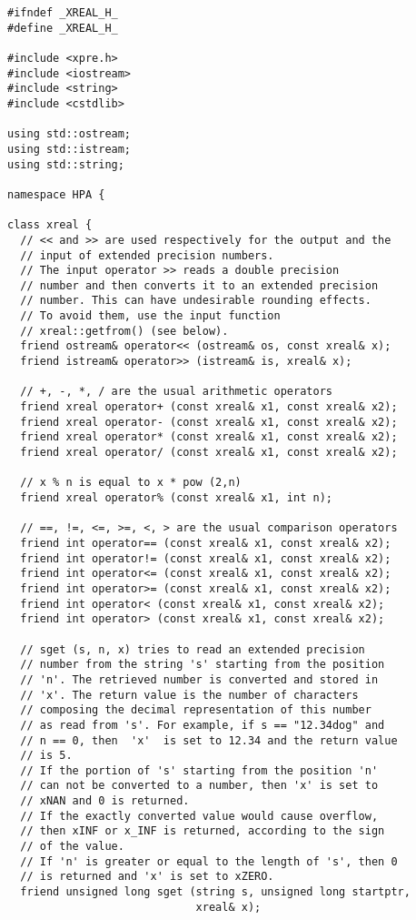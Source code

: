 \documentclass{article}
\begin{document}
\begin{verbatim}
#ifndef _XREAL_H_
#define _XREAL_H_

#include <xpre.h>
#include <iostream>
#include <string>
#include <cstdlib>

using std::ostream;
using std::istream;
using std::string;

namespace HPA {

class xreal {
  // << and >> are used respectively for the output and the 
  // input of extended precision numbers.
  // The input operator >> reads a double precision
  // number and then converts it to an extended precision 
  // number. This can have undesirable rounding effects. 
  // To avoid them, use the input function
  // xreal::getfrom() (see below).
  friend ostream& operator<< (ostream& os, const xreal& x);
  friend istream& operator>> (istream& is, xreal& x);

  // +, -, *, / are the usual arithmetic operators
  friend xreal operator+ (const xreal& x1, const xreal& x2);
  friend xreal operator- (const xreal& x1, const xreal& x2);
  friend xreal operator* (const xreal& x1, const xreal& x2);
  friend xreal operator/ (const xreal& x1, const xreal& x2);

  // x % n is equal to x * pow (2,n)
  friend xreal operator% (const xreal& x1, int n);

  // ==, !=, <=, >=, <, > are the usual comparison operators
  friend int operator== (const xreal& x1, const xreal& x2);
  friend int operator!= (const xreal& x1, const xreal& x2);
  friend int operator<= (const xreal& x1, const xreal& x2);
  friend int operator>= (const xreal& x1, const xreal& x2);
  friend int operator< (const xreal& x1, const xreal& x2);
  friend int operator> (const xreal& x1, const xreal& x2);

  // sget (s, n, x) tries to read an extended precision
  // number from the string 's' starting from the position
  // 'n'. The retrieved number is converted and stored in
  // 'x'. The return value is the number of characters 
  // composing the decimal representation of this number
  // as read from 's'. For example, if s == "12.34dog" and
  // n == 0, then  'x'  is set to 12.34 and the return value
  // is 5.
  // If the portion of 's' starting from the position 'n'
  // can not be converted to a number, then 'x' is set to
  // xNAN and 0 is returned.
  // If the exactly converted value would cause overflow, 
  // then xINF or x_INF is returned, according to the sign
  // of the value.
  // If 'n' is greater or equal to the length of 's', then 0
  // is returned and 'x' is set to xZERO.
  friend unsigned long sget (string s, unsigned long startptr,
                             xreal& x);


\end{verbatim}
\end{document}
